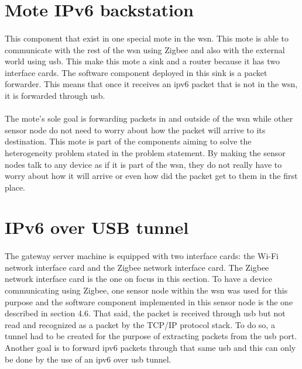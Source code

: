 \documentclass[oneside,12pt,a4paper,final]{book}
\begin{document}
\section{Mote IPv6 backstation}
\paragraph{} 
This component that exist in one special mote in the \gls{wsn}. This mote is able to communicate with the rest of the \gls{wsn} using Zigbee and also with the external world using \gls{usb}. This make this mote a sink and a router because it has two interface cards. The software component deployed in this sink is a packet forwarder. This means that once it receives an \gls{ipv6} packet that is not in the \gls{wsn}, it is forwarded through \gls{usb}.
\paragraph{}
The mote's sole goal is forwarding packets in and outside of the \gls{wsn} while other sensor node do not need to worry about how the packet will arrive to its destination. This mote is part of the components aiming to solve the heterogeneity problem stated in the problem statement. By making the sensor nodes talk to any device as if it is part of the \gls{wsn}, they do not really have to worry about how it will arrive or even how did the packet get to them in the first place.

\section{IPv6 over USB tunnel}
\paragraph{}
The gateway server machine is equipped with two interface cards: the Wi-Fi network interface card and the Zigbee network interface card. The Zigbee network interface card is the one on focus in this section. To have a device communicating using Zigbee, one sensor node within the \gls{wsn} was used for this purpose and the software component implemented in this sensor node is the one described in section 4.6. That said, the packet is received through \gls{usb} but not read and recognized as a packet by the TCP/IP protocol stack. To do so, a tunnel had to be created for the purpose of extracting packets from the \gls{usb} port. Another goal is to forward \gls{ipv6} packets through that same \gls{usb} and this can only be done by the use of an \gls{ipv6} over \gls{usb} tunnel. 
\end{document}
